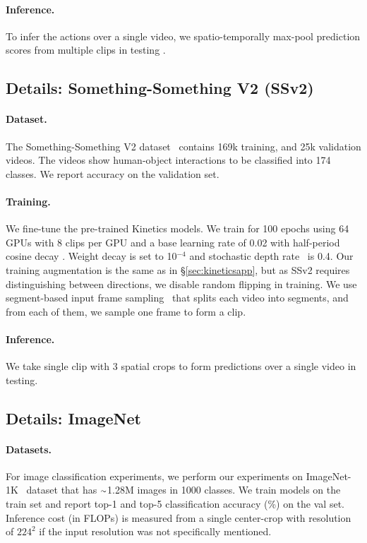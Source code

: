 \documentclass[10pt,twocolumn,letterpaper]{article}
\newcommand{\app}{\raise.17ex\hbox{$\scriptstyle\sim$}}
\begin{document}
\paragraph{Inference.} 
To infer the actions over a single video, we spatio-temporally max-pool prediction scores from multiple clips in testing \cite{Feichtenhofer2019}.

\subsection{Details: Something-Something V2 (SSv2)}\label{sec:ssv2}

\paragraph{Dataset.}
The Something-Something V2 dataset~\cite{ssv2} contains 169k training, and 25k validation videos.
The videos show human-object interactions to be classified into 174 classes.
We report accuracy on the validation set. 

\paragraph{Training.}
We fine-tune the pre-trained Kinetics models. We train for 100 epochs using 64 GPUs with 8 clips per GPU and a base learning rate of 0.02 with half-period cosine decay \cite{Loshchilov2016}. Weight decay is set to 10$^{-4}$ and stochastic depth rate~\cite{huang2016deep} is 0.4. Our training augmentation is the same as in \S\ref{sec:kineticsapp}, but as SSv2 requires distinguishing between directions, we disable random flipping in training.
We use segment-based input frame sampling~\cite{lin2018temporal} that splits each video into segments, and from each of them, we sample one frame to form a clip.

\paragraph{Inference.} We take single clip with 3 spatial crops to form predictions over a single video in testing.

\subsection{Details: ImageNet}\label{sec:details_imagenet}

\paragraph{Datasets.} For image classification experiments, we perform our experiments on ImageNet-1K~\cite{Deng2009} dataset that has $\app$1.28M images in 1000 classes.
We train models on the {train} set and report top-1 and top-5 classification accuracy (\%) on the  {val} set. Inference cost (in FLOPs) is measured from a single center-crop with resolution of $224^2$ if the input resolution was not specifically mentioned.
\end{document}
